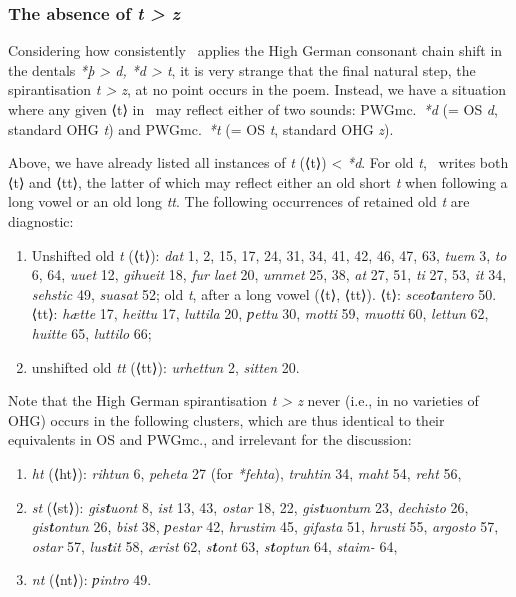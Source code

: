 \subsubsection{The absence of \emph{t > z}}

Considering how consistently \Hildebrandslied\ applies the High German consonant chain shift in the dentals \emph{*þ > d, *d > t}, it is very strange that the final natural step, the spirantisation \emph{t > z}, at no point occurs in the poem.  Instead, we have a situation where any given ⟨t⟩ in \HildMS\ may reflect either of two sounds: PWGmc.~\emph{*d} (= OS \emph{d}, standard OHG \emph{t}) and PWGmc.~\emph{*t} (= OS \emph{t}, standard OHG \emph{z}).

Above, we have already listed all instances of \emph{t} (⟨t⟩) < \emph{*d}.  For old \emph{t}, \Hildebrandslied\ writes both ⟨t⟩ and ⟨tt⟩, the latter of which may reflect either an old short \emph{t} when following a long vowel or an old long \emph{tt}.  The following occurrences of retained old \emph{t} are diagnostic:

\begin{enumerate}
  \item Unshifted old \emph{t} (⟨t⟩): \emph{dat} 1, 2, 15, 17, 24, 31, 34, 41, 42, 46, 47, 63,  \emph{tuem} 3, \emph{to} 6, 64, \emph{uuet} 12, \emph{gihueit} 18, \emph{fur laet} 20, \emph{ummet} 25, 38, \emph{at} 27, 51, \emph{ti} 27, 53, \emph{it} 34, \emph{sehstic} 49, \emph{suasat} 52; %
  old \emph{t}, after a long vowel (⟨t⟩, ⟨tt⟩).  ⟨t⟩: \emph{sceo\textbf{t}antero} 50.  ⟨tt⟩: \emph{hætte} 17, \emph{heittu} 17, \emph{luttila} 20, \emph{ƿettu} 30,  \emph{motti} 59, \emph{muotti} 60, \emph{lettun} 62, \emph{huitte} 65, \emph{luttilo} 66;
  \item unshifted old \emph{tt} (⟨tt⟩): \emph{urhettun} 2, \emph{sitten} 20.
\end{enumerate}

Note that the High German spirantisation \emph{t > z} never (i.e., in no varieties of OHG) occurs in the following clusters, which are thus identical to their equivalents in OS and PWGmc., and irrelevant for the discussion:

\begin{enumerate}
  \item \emph{ht} (⟨ht⟩): \emph{rihtun} 6, \emph{peheta} 27 (for \emph{*fehta}), \emph{truhtin} 34, \emph{maht} 54, \emph{reht} 56, %
  \item \emph{st} (⟨st⟩): \emph{gis\textbf{t}uont} 8, \emph{ist} 13, 43, \emph{ostar} 18, 22, \emph{gis\textbf{t}uontum} 23, \emph{dechisto} 26, \emph{gis\textbf{t}ontun} 26, \emph{bist} 38, \emph{ƿestar} 42, \emph{hrustim} 45, \emph{gifasta} 51, \emph{hrusti} 55, \emph{argosto} 57, %
  \emph{ostar} 57, \emph{lus\textbf{t}it} 58, \emph{ærist} 62, \emph{s\textbf{t}ont} 63, \emph{s\textbf{t}optun} 64, \emph{staim-} 64,
  \item \emph{nt} (⟨nt⟩): \emph{ƿintro} 49.
\end{enumerate}

